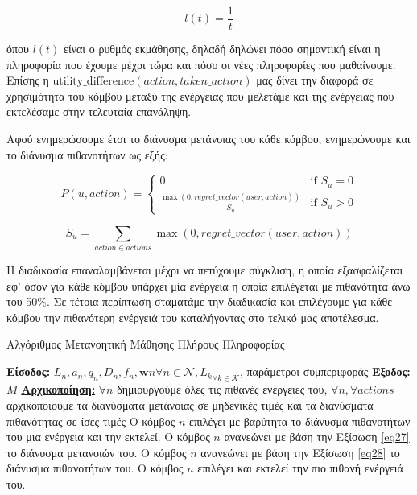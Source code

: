 \vspace{-3pt}

\[l(t) = \frac{1}{t}\]

\noindent
όπου $l(t)$ είναι ο ρυθμός εκμάθησης, δηλαδή δηλώνει πόσο σημαντική είναι η πληροφορία που έχουμε μέχρι τώρα και πόσο οι νέες πληροφορίες που μαθαίνουμε. Επίσης η $\text{utility\_difference}(action, taken\_action)$ μας δίνει την διαφορά σε χρησιμότητα του κόμβου μεταξύ της ενέργειας που μελετάμε και της ενέργειας που εκτελέσαμε στην τελευταία επανάληψη. 

Αφού ενημερώσουμε έτσι το διάνυσμα μετάνοιας του κάθε κόμβου, ενημερώνουμε και το διάνυσμα πιθανοτήτων ως εξής:

\vspace{-5pt}

\begin{equation}
P(u,action) =
\begin{cases}
    0 & \text{if } S_u = 0 \\
    \frac{\max(0, regret\_vector(user, action))}{S_u} & \text{if } S_u > 0
\end{cases}
\label{eq28}
\end{equation}

\vspace{-3pt}

\[S_u = \sum_{action \in actions} \max(0, regret\_vector(user, action))\]

Η διαδικασία επαναλαμβάνεται μέχρι να πετύχουμε σύγκλιση, η οποία εξασφαλίζεται εφ' όσον για κάθε κόμβου υπάρχει μία ενέργεια η οποία επιλέγεται με πιθανότητα άνω του 50\%. Σε τέτοια περίπτωση σταματάμε την διαδικασία και επιλέγουμε για κάθε κόμβου την πιθανότερη ενέργειά του καταλήγοντας στο τελικό μας αποτέλεσμα.

\newpage

\begin{algorithm}[h]
\caption{Αλγόριθμος Μετανοητική Μάθησης Πλήρους Πληροφορίας} \label{algorithm 5}
\begin{algorithmic}[1]
\STATE \textbf{\underline{Είσοδος:}} ${L_n, a_n, q_n, D_n, f_n, \mathbf{w}n}{\forall n\in \mathcal{N}}, {L_k}_{\forall k \in \mathcal{K}}$, παράμετροι συμπεριφοράς
\STATE \textbf{\underline{Έξοδος:}}  $M$
\STATE \textbf{\underline{Αρχικοποίηση:}} $\forall n$ δημιουργούμε όλες τις πιθανές ενέργειες του, $\forall n, \forall actions$ αρχικοποιούμε τα διανύσματα μετάνοιας σε μηδενικές τιμές και τα διανύσματα πιθανότητας σε ίσες τιμές
\STATE Ο κόμβος $n$ επιλέγει με βαρύτητα το διάνυσμα πιθανοτήτων του μια ενέργεια και την εκτελεί.
\ENDFOR
{}
\STATE Ο κόμβος $n$ ανανεώνει με βάση την Εξίσωση \ref{eq27} το διάνυσμα μετανοιών του.
\STATE Ο κόμβος $n$ ανανεώνει με βάση την Εξίσωση \ref{eq28} το διάνυσμα πιθανοτήτων του.
\ENDFOR
\ENDWHILE
{}
\STATE Ο κόμβος $n$ επιλέγει και εκτελεί την πιο πιθανή ενέργειά του.
\ENDFOR
\end{algorithmic}
\end{algorithm}

